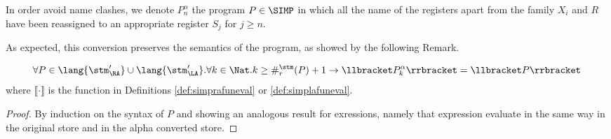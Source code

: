 \begin{notation}
  \label{notation:alpha}
  In order avoid name clashes, we denote $P^\alpha_n$ the program $P\in \SIMP$
  in which all the name of the registers apart from the family $X_i$ and $R$
  have been reassigned to an appropriate register $S_j$ for $j\ge n$.
\end{notation}

As expected, this conversion preserves the semantics of the program, as
showed by the following Remark.

\begin{remark}
  $$
  \forall P \in \lang{\stm_\RA'}\cup \lang{\stm_\LA'}. \forall k \in \Nat.
  k\ge \#_r^\stm(P)+1\to \llbracket P^\alpha_k\rrbracket =\llbracket P\rrbracket
  $$
  where $\llbracket \cdot \rrbracket$ is the function in Definitions \ref{def:simprafuneval} or
  \ref{def:simplafuneval}.
\end{remark}
\begin{proof}
  By induction on the syntax of $P$ and showing an analogous result for exressions,
  namely that expression evaluate in the same way in the original store and in the
  alpha converted store.
\end{proof}


